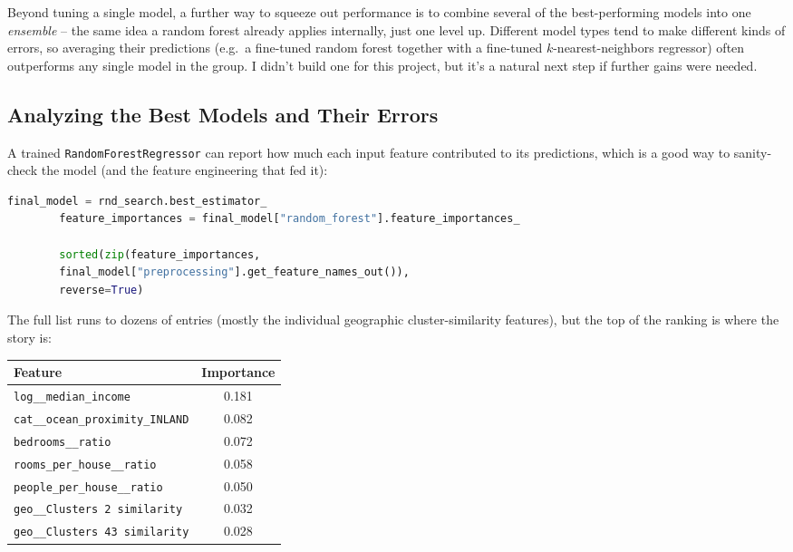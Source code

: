 \documentclass[11pt]{article}
\begin{document}
	Beyond tuning a single model, a further way to squeeze out performance is to combine several of the best-performing models into one \emph{ensemble} -- the same idea a random forest already applies internally, just one level up. Different model types tend to make different kinds of errors, so averaging their predictions (e.g.\ a fine-tuned random forest together with a fine-tuned $k$-nearest-neighbors regressor) often outperforms any single model in the group. I didn't build one for this project, but it's a natural next step if further gains were needed.
	
	\subsection{Analyzing the Best Models and Their Errors}
	
	A trained \texttt{RandomForestRegressor} can report how much each input feature contributed to its predictions, which is a good way to sanity-check the model (and the feature engineering that fed it):
	
	\begin{lstlisting}[language=Python]
		final_model = rnd_search.best_estimator_
		feature_importances = final_model["random_forest"].feature_importances_
		
		sorted(zip(feature_importances,
		final_model["preprocessing"].get_feature_names_out()),
		reverse=True)
	\end{lstlisting}
	
	The full list runs to dozens of entries (mostly the individual geographic cluster-similarity features), but the top of the ranking is where the story is:
	
	\begin{center}
		\small
		\begin{tabular}{@{}lc@{}}
			\toprule
			\textbf{Feature} & \textbf{Importance} \\
			\midrule
			\texttt{log\_\_median\_income} & 0.181 \\
			\texttt{cat\_\_ocean\_proximity\_INLAND} & 0.082 \\
			\texttt{bedrooms\_\_ratio} & 0.072 \\
			\texttt{rooms\_per\_house\_\_ratio} & 0.058 \\
			\texttt{people\_per\_house\_\_ratio} & 0.050 \\
			\texttt{geo\_\_Clusters 2 similarity} & 0.032 \\
			\texttt{geo\_\_Clusters 43 similarity} & 0.028 \\
			\bottomrule
		\end{tabular}
	\end{center}
	
\end{document}

